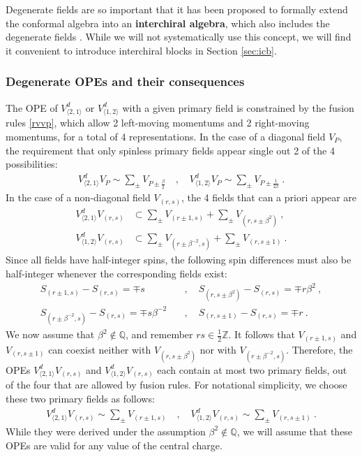 \documentclass[12pt, a4paper]{article}
\theoremstyle{break}
\begin{document}
Degenerate fields are so important that it has been proposed to formally extend the conformal algebra into an \textbf{interchiral algebra}, which also includes the degenerate fields \cite{grs12}. While we will not systematically use this concept, we will find it convenient to introduce interchiral blocks in Section \ref{sec:icb}. 

\subsubsection{Degenerate OPEs and their consequences}\label{sec:dotc}

The OPE of $V^d_{\langle 2,1\rangle}$ or $V^d_{\langle 1,2\rangle}$ with a given primary field is constrained by the fusion rules \eqref{rvvp}, which allow 2 left-moving momentums and 2 right-moving momentums, for a total of 4 representations.  In the case of a diagonal field $V_P$, the requirement that only spinless primary fields appear single out 2 of the 4 possibilities:
\begin{align}
 \boxed{V^d_{\langle 2,1\rangle} V_P \sim \sum_\pm V_{P\pm\frac{\beta}{2}}} \quad , \quad \boxed{V^d_{\langle 1,2\rangle} V_P \sim \sum_\pm V_{P\pm\frac{1}{2\beta}}} \ . 
 \label{vpope}
\end{align}
In the case of a non-diagonal field $V_{(r,s)}$, the 4 fields that can a priori appear are
\begin{align}
 V^d_{\langle 2,1\rangle}V_{(r,s)} &\subset \sum_\pm V_{(r\pm 1,s)} + \sum_\pm V_{(r,s\pm \beta^2)}\ ,
 \label{vtovrs}
 \\
 V^d_{\langle 1,2\rangle}V_{(r,s)} &\subset \sum_\pm V_{(r\pm \beta^{-2},s)} + \sum_\pm V_{(r,s\pm 1)}\ .
 \label{votvrs}
\end{align}
Since all fields have half-integer spins, the following spin differences must also be half-integer whenever the corresponding fields exist: 
\begin{align}
 S_{(r\pm 1,s)} - S_{(r,s)} = \mp s &\quad , \quad S_{(r,s\pm \beta^2)} - S_{(r,s)} = \mp r\beta^2\ ,
 \label{sdiff1}
 \\
 S_{(r\pm \beta^{-2},s)} - S_{(r,s)} = \mp s\beta^{-2} &\quad , \quad S_{(r,s\pm 1)} - S_{(r,s)} = \mp r\ . 
 \label{sdiff2}
\end{align}
We now assume that $\beta^2\notin \mathbb{Q}$, and remember $rs\in\frac12\mathbb{Z}$. It follows that $V_{(r\pm 1,s)}$ and $V_{(r,s\pm 1)}$ can coexist neither with $V_{(r,s\pm \beta^2)}$ nor with $V_{(r\pm \beta^{-2},s)}$. Therefore, the OPEs $V^d_{\langle 2,1\rangle}V_{(r,s)}$ and $V^d_{\langle 1,2\rangle}V_{(r,s)}$ each contain at most two primary fields, out of the four that are allowed by fusion rules. For notational simplicity, we choose these two primary fields as follows: 
\begin{align}
 \boxed{V^d_{\langle 2,1\rangle}V_{(r,s)} \sim \sum_\pm V_{(r\pm 1,s)}} \quad ,\quad
 \boxed{V^d_{\langle 1,2\rangle}V_{(r,s)} \sim \sum_\pm V_{(r,s\pm 1)}}\ . 
 \label{vdvrs}
\end{align}
While they were derived under the assumption $\beta^2\notin \mathbb{Q}$, we will assume that these OPEs are valid for any value of the central charge. 
\end{document}
